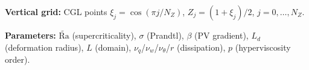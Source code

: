\documentclass[11pt]{article}
\newcommand{\Rav}{\widetilde{\mathrm{Ra}}}
\newcommand{\Ld}{L_d}
\begin{document}
{{\textbf{Vertical grid:} CGL points $\xi_j = \cos(\pi j/N_Z)$, $Z_j = (1+\xi_j)/2$, $j = 0,\ldots,N_Z$.

\textbf{Parameters:} $\Rav$ (supercriticality), $\sigma$ (Prandtl), $\beta$ (PV gradient), $\Ld$ (deformation radius), $L$ (domain), $\nu_q$/$\nu_w$/$\nu_\theta$/$r$ (dissipation), $p$ (hyperviscosity order).
}}
\end{document}
